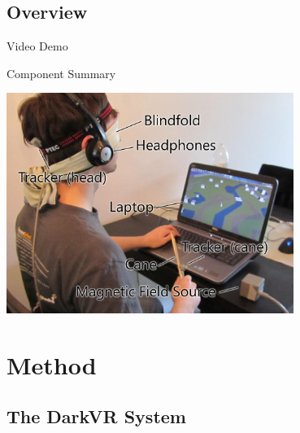 \documentclass{beamer}
\begin{document}
\subsection{Overview}

\begin{frame}{Video Demo}

\begin{center}
\end{center}

\end{frame}

\begin{frame}{Component Summary}

\begin{center}
\includegraphics[width=0.7\textwidth]{images/details2}
\end{center}

\end{frame}

\section{Method}

\subsection{The DarkVR System}
\end{document}
